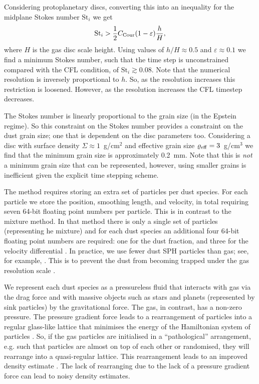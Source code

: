 \documentclass[fleqn,usenatbib]{mnras}
\begin{document}
Considering protoplanetary discs, converting this into an inequality for the
midplane Stokes number \(\mathrm{St}_i\) we get
%
\begin{align}
   \mathrm{St}_i > \frac{1}{2} C_{\rm Cour} (1 - \varepsilon) \frac{h}{H},
\end{align}
%
where \(H\) is the gas disc scale height. Using values of \(h/H \approx 0.5\)
and \(\varepsilon \approx 0.1\) we find a minimum Stokes number, such that the
time step is unconstrained compared with the CFL condition, of \(\mathrm{St}_i
\gtrsim 0.08\). Note that the numerical resolution is inversely proportional to
\(h\). So, as the resolution increases this restriction is loosened. However, as
the resolution increases the CFL timestep decreases.

The Stokes number is linearly proportional to the grain size (in the Epstein
regime). So this constraint on the Stokes number provides a constraint on the
dust grain size; one that is dependent on the disc parameters too. Considering a
disc with surface density \(\Sigma \approx 1\)~g/cm\({}^2\) and effective grain
size \(\varrho_{\rm eff} = 3\)~g/cm\({}^3\) we find that the minimum grain size
is approximately 0.2~mm. Note that this is \emph{not} a minimum grain size that
can be represented, however, using smaller grains is inefficient given the
explicit time stepping scheme.

The method requires storing an extra set of particles per dust species. For each
particle we store the position, smoothing length, and velocity, in total
requiring seven 64-bit floating point numbers per particle. This is in contrast
to the mixture method. In that method there is only a single set of particles
(representing he mixture) and for each dust species an additional four 64-bit
floating point numbers are required: one for the dust fraction, and three for
the velocity differential \citep{Hutchison2018MNRAS.476.2186H}. In practice, we
use fewer dust SPH particles than gas; see, for example,
\citet{Dipierro2015MNRAS.453L..73D, Mentiplay2019MNRAS.484L.130M,
Calcino2019MNRAS.490.2579C}. This is to prevent the dust from becoming trapped
under the gas resolution scale \citep{Laibe2012MNRAS.420.2345L}.

We represent each dust species as a pressureless fluid that interacts with gas
via the drag force and with massive objects such as stars and planets
(represented by sink particles) by the gravitational force. The gas, in
contrast, has a non-zero pressure. The pressure gradient force leads to a
rearrangement of particles into a regular glass-like lattice
\citep{Monaghan2005RPPh...68.1703M} that minimises the energy of the Hamiltonian
system of particles \citep{Price2012JCoPh.231..759P}. So, if the gas particles
are initialised in a ``pathological'' arrangement, e.g. such that particles are
almost on top of each other or randomised, they will rearrange into a
quasi-regular lattice. This rearrangement leads to an improved density estimate
\citep{Price2012JCoPh.231..759P}. The lack of rearranging due to the lack of a
pressure gradient force can lead to noisy density estimates.
\end{document}
